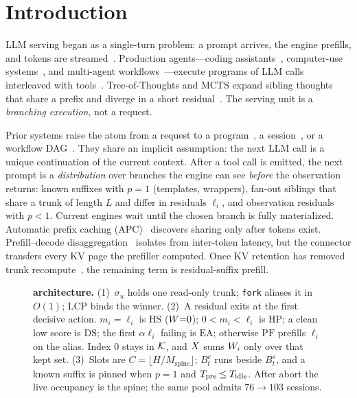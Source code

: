 \section{Introduction}
\label{sec:intro}

LLM serving began as a single-turn problem: a prompt arrives, the engine prefills, and tokens are streamed~\cite{orca,vllm,sglang}.
Production agents---coding assistants~\cite{sweagent,openhands}, computer-use systems~\cite{webarena}, and multi-agent workflows~\cite{autogen,metagpt}---execute programs of LLM calls interleaved with tools~\cite{react,compoundai}.
Tree-of-Thoughts and MCTS expand sibling thoughts that share a prefix and diverge in a short residual~\cite{tot,hive}.
The serving unit is a \emph{branching execution}, not a request.

Prior systems raise the atom from a request to a program~\cite{autellix,thunderagent}, a session~\cite{continuum,mori}, or a workflow DAG~\cite{ayo,parrot,pythia}.
They share an implicit assumption: the next LLM call is a unique continuation of the current context.
After a tool call is emitted, the next prompt is a \emph{distribution} over branches the engine can see \emph{before} the observation returns:
known suffixes with $p{=}1$ (templates, wrappers), fan-out siblings that share a trunk of length $L$ and differ in residuals $\ell_i$, and observation residuals with $p{<}1$.
Current engines wait until the chosen branch is fully materialized.
Automatic prefix caching (APC)~\cite{vllm,sglang} discovers sharing only after tokens exist. Prefill--decode disaggregation~\cite{distserve,splitwise} isolates \ttft{} from inter-token latency, but the connector transfers every KV page the prefiller computed.
Once KV retention has removed trunk recompute~\cite{continuum,mori}, the remaining \ttft{} term is residual-suffix prefill.

\begin{figure}[t]
\centering
\resizebox{\textwidth}{!}{}
\caption{\textbf{\sys{} architecture.}
(1)~$\sigma_u$ holds one read-only trunk; \texttt{fork} aliases it in $O(1)$; LCP binds the winner.
(2)~A residual exits at the first decisive action.
$m_i=\ell_i$ is $\mathrm{HS}$ ($W{=}0$); $0{<}m_i{<}\ell_i$ is $\mathrm{HP}$; a clean low score is $\mathrm{DS}$; the first $\alpha\ell_i$ failing is $\mathrm{EA}$; otherwise $\mathrm{PF}$ prefills $\ell_i$ on the alias.
Index $0$ stays in $\mathcal{K}$, and $X$ sums $W_i$ only over that kept set.
(3)~Slots are $C=\lfloor H/M_{\mathrm{spine}}\rfloor$; $B^c_t$ runs beside $B^s_t$, and a known suffix is pinned when $p{=}1$ and $T_{\mathrm{pre}}\le T_{\mathrm{idle}}$.
After abort the live occupancy is the spine; the same pool admits $76{\to}103$ sessions.}
\label{fig:system}
\end{figure}

